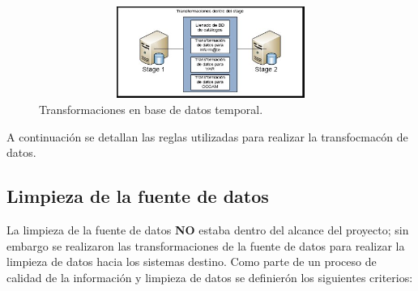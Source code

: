 \documentclass[a4paper,openright,12pt]{book}
\begin{document}
\begin{figure}[htb]
  \begin{center}
    \includegraphics[width=12cm, height=3cm, scale=0.5]{Transformaciones_stage.jpg}
        \caption{Transformaciones en base de datos temporal.}
    \label{fig:arquitectura}
  \end{center}
\end{figure}

A continuaci\'on se detallan las reglas utilizadas para realizar la transfocmac\'on de datos.
\subsection{Limpieza de la fuente de datos}
La limpieza de la fuente de datos \textbf{NO} estaba dentro del alcance del proyecto; sin embargo se realizaron las transformaciones de la fuente de datos para realizar la limpieza de datos hacia los sistemas destino. Como parte de un proceso de calidad de la informaci\'on y limpieza de datos se definier\'on los siguientes criterios: 
\end{document}
